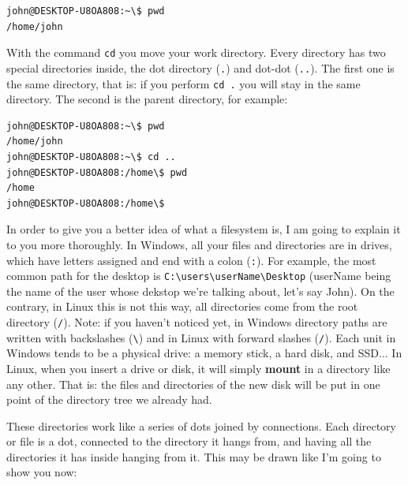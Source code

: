 \documentclass[a4paper]{article}
\begin{document}
\noindent
\begin{minipage}[H]{\linewidth}
\mbox{}
\begin{lstlisting}[style=terminalStyle]
john@DESKTOP-U8OA808:~\$ pwd
/home/john
\end{lstlisting}
\end{minipage}

With the command \verb!cd! you move your work directory. Every directory has two
special directories inside, the dot directory (\verb!.!) and dot-dot
(\verb!..!). The first one is the same directory, that is: if you perform
\verb!cd .! you will stay in the same directory. The second is the parent
directory, for example:

\noindent
\begin{minipage}[H]{\linewidth}
\mbox{}
\begin{lstlisting}[style=terminalStyle]
john@DESKTOP-U8OA808:~\$ pwd
/home/john
john@DESKTOP-U8OA808:~\$ cd ..
john@DESKTOP-U8OA808:/home\$ pwd
/home
john@DESKTOP-U8OA808:/home\$
\end{lstlisting}
\end{minipage}

In order to give you a better idea of what a filesystem is, I am going to
explain it to you more thoroughly. In Windows, all your files and directories
are in drives, which have letters assigned and end with a colon (\verb!:!).
For example, the most common path for the desktop is
\verb!C:\users\userName\Desktop! (userName being the name of the user whose
dekstop we're talking about, let's say John). On the contrary, in Linux this is
not this way, all directories come from the root directory (\verb!/!). Note: if
you haven't noticed yet, in Windows directory paths are written with backslashes
(\verb!\!) and in Linux with forward slashes (\verb!/!). Each unit in Windows
tends to be a physical drive: a memory stick, a hard disk, and SSD... In Linux,
when you insert a drive or disk, it will simply \textbf{mount} in a directory
like any other. That is: the files and directories of the new disk will be put
in one point of the directory tree we already had.

These directories work like a series of dots joined by connections. Each
directory or file is a dot, connected to the directory it hangs from, and
having all the directories it has inside hanging from it. This may be drawn
like I'm going to show you now:
\end{document}
